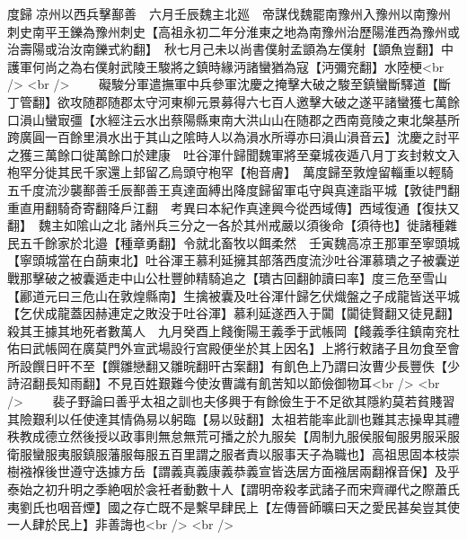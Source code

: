 度歸凉州以西兵擊鄯善　六月壬辰魏主北廵　帝謀伐魏罷南豫州入豫州以南豫州刺史南平王鑠為豫州刺史【高祖永初二年分淮東之地為南豫州治歷陽淮西為豫州或治壽陽或治汝南鑠式約翻】　秋七月己未以尚書僕射孟顗為左僕射【顗魚豈翻】中護軍何尚之為右僕射武陵王駿將之鎮時緣沔諸蠻猶為寇【沔彌兖翻】水陸梗<br />
<br />
　　礙駿分軍遣撫軍中兵參軍沈慶之掩擊大破之駿至鎮蠻斷驛道【斷丁管翻】欲攻随郡随郡太守河東柳元景募得六七百人邀擊大破之遂平諸蠻獲七萬餘口溳山蠻㝡彊【水經注云水出蔡陽縣東南大洪山山在随郡之西南竟陵之東北槃基所跨廣圓一百餘里溳水出于其山之隂時人以為溳水所導亦曰溳山溳音云】沈慶之討平之獲三萬餘口徙萬餘口於建康　吐谷渾什歸聞魏軍將至棄城夜遁八月丁亥封敕文入枹罕分徙其民千家還上邽留乙烏頭守枹罕【枹音膚】　萬度歸至敦煌留輜重以輕騎五千度流沙襲鄯善壬辰鄯善王真達面縛出降度歸留軍屯守與真達詣平城【敦徒門翻重直用翻騎奇寄翻降戶江翻　考異曰本紀作真達興今從西域傳】西域復通【復扶又翻】　魏主如隂山之北諸州兵三分之一各於其州戒嚴以須後命【須待也】徙諸種雜民五千餘家於北邉【種章勇翻】令就北畜牧以餌柔然　壬寅魏高凉王那軍至寧頭城【寧頭城當在白蓢東北】吐谷渾王慕利延擁其部落西度流沙吐谷渾慕璝之子被囊逆戰那擊破之被囊遁走中山公杜豐帥精騎追之【璝古回翻帥讀曰率】度三危至雪山【酈道元曰三危山在敦煌縣南】生擒被囊及吐谷渾什歸乞伏熾盤之子成龍皆送平城【乞伏成龍蓋因赫連定之敗没于吐谷渾】慕利延遂西入于闐【闐徒賢翻又徒見翻】殺其王據其地死者數萬人　九月癸酉上餞衡陽王義季于武帳岡【餞義季往鎮南兖杜佑曰武帳岡在廣莫門外宣武場設行宫殿便坐於其上因名】上將行敕諸子且勿食至會所設饌日旰不至【饌雛戀翻又雛晥翻旰古案翻】有飢色上乃謂曰汝曹少長豐佚【少詩沼翻長知雨翻】不見百姓艱難今使汝曹識有飢苦知以節儉御物耳<br />
<br />
　　裴子野論曰善乎太祖之訓也夫侈興于有餘儉生于不足欲其隱約莫若貧賤習其險艱利以任使達其情偽易以躬臨【易以䜴翻】太祖若能率此訓也難其志操卑其禮秩教成德立然後授以政事則無怠無荒可播之於九服矣【周制九服侯服甸服男服采服衛服蠻服夷服鎮服藩服每服五百里謂之服者責以服事天子為職也】高祖思固本枝崇樹襁褓後世遵守迭據方岳【謂義真義康義恭義宣皆迭居方面襁居兩翻褓音保】及乎泰始之初升明之季絶咽於衾衽者動數十人【謂明帝殺孝武諸子而宋齊禪代之際蕭氏夷劉氏也咽音煙】國之存亡既不是繫早肆民上【左傳晉師曠曰天之愛民甚矣豈其使一人肆於民上】非善誨也<br />
<br />
